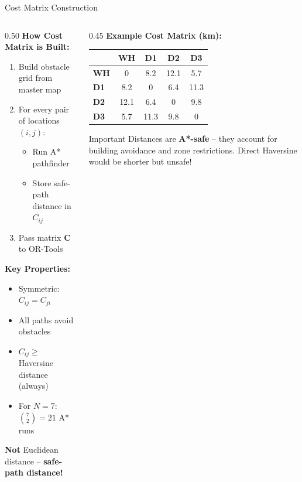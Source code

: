 \documentclass[aspectratio=169, 11pt]{beamer}
\begin{document}
\begin{frame}{Cost Matrix Construction}
\begin{columns}[T]
\begin{column}{0.50\textwidth}
\textcolor{neongreen}{\textbf{How Cost Matrix is Built:}}\\[0.2cm]
\small
\begin{enumerate}
    \item Build obstacle grid from master map
    \item For every pair of locations $(i, j)$:
        \begin{itemize}\footnotesize
            \item Run A* pathfinder
            \item Store safe-path distance in $C_{ij}$
        \end{itemize}
    \item Pass matrix $\mathbf{C}$ to OR-Tools
\end{enumerate}

\vspace{0.3cm}
\textcolor{accentblue}{\textbf{Key Properties:}}
\begin{itemize}\small
    \item Symmetric: $C_{ij} = C_{ji}$
    \item All paths avoid obstacles
    \item $C_{ij} \geq$ Haversine distance (always)
    \item For $N=7$: $\binom{7}{2} = 21$ A* runs
\end{itemize}

\vspace{0.2cm}
\textcolor{warnorange}{\textbf{Not}} Euclidean distance -- \textbf{safe-path distance!}
\end{column}
\begin{column}{0.45\textwidth}
\small
\textcolor{neongreen}{\textbf{Example Cost Matrix (km):}}\\[0.2cm]
\footnotesize
\begin{tabular}{@{}lcccc@{}}
\toprule
& \textbf{WH} & \textbf{D1} & \textbf{D2} & \textbf{D3} \\
\midrule
\textbf{WH} & 0 & 8.2 & 12.1 & 5.7 \\
\textbf{D1} & 8.2 & 0 & 6.4 & 11.3 \\
\textbf{D2} & 12.1 & 6.4 & 0 & 9.8 \\
\textbf{D3} & 5.7 & 11.3 & 9.8 & 0 \\
\bottomrule
\end{tabular}

\vspace{0.3cm}
\begin{alertblock}{\footnotesize Important}
\footnotesize
Distances are \textbf{A*-safe} -- they account for building avoidance and zone restrictions. Direct Haversine would be shorter but unsafe!
\end{alertblock}
\end{column}
\end{columns}
\end{frame}
\end{document}
